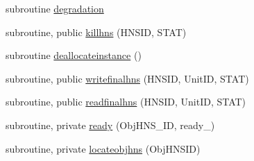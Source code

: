 \begin{DoxyCompactItemize}
\item 
subroutine \mbox{\hyperlink{namespacemodulehns_a378c8e88593c5f512652c5189a9a9729}{degradation}}
\item 
subroutine, public \mbox{\hyperlink{namespacemodulehns_ae9cbb1085170907acb10a56c08c0a669}{killhns}} (H\+N\+S\+ID, S\+T\+AT)
\item 
subroutine \mbox{\hyperlink{namespacemodulehns_a3c016aeb7936c47cd4071d8b9aa3ac75}{deallocateinstance}} ()
\item 
subroutine, public \mbox{\hyperlink{namespacemodulehns_abf878e74b0b3dfd62305bbe1afe7b434}{writefinalhns}} (H\+N\+S\+ID, Unit\+ID, S\+T\+AT)
\item 
subroutine, public \mbox{\hyperlink{namespacemodulehns_a41374dfc4d54eb48869c9b6727298941}{readfinalhns}} (H\+N\+S\+ID, Unit\+ID, S\+T\+AT)
\item 
subroutine, private \mbox{\hyperlink{namespacemodulehns_a1b4bda03d346568b51278fca35b05366}{ready}} (Obj\+H\+N\+S\+\_\+\+ID, ready\+\_\+)
\item 
subroutine, private \mbox{\hyperlink{namespacemodulehns_aff869b6b5dffbe4b2d00b777a1c0455d}{locateobjhns}} (Obj\+H\+N\+S\+ID)
\end{DoxyCompactItemize}
